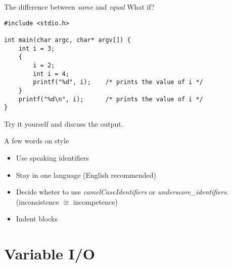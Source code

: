 \begin{frame}[fragile]{The difference between \textit{same} and \textit{equal}}
	What if?
	\begin{lstlisting}
#include <stdio.h>

int main(char argc, char* argv[]) {
	int i = 3;
	{
		i = 2;
		int i = 4;
		printf("%d", i);	/* prints the value of i */
	}
	printf("%d\n", i);		/* prints the value of i */
}
\end{lstlisting}
	Try it yourself and discuss the output.
\end{frame}
\begin{frame}{A few words on style}
	\begin{itemize}
		\item Use speaking identifiers
		\item Stay in one language (English recommended)
		\item Decide wheter to use \textit{camelCaseIdentifiers} or \textit{underscore\_identifiers}.\\
		(inconsistence $\cong$ incompetence)
		\item Indent blocks
	\end{itemize}
\end{frame}
\section{Variable I/O}
